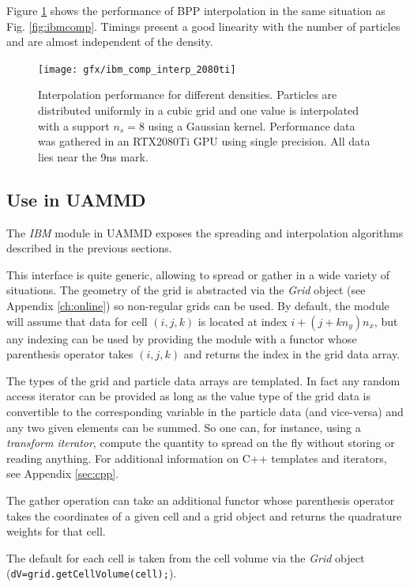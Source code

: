 \documentclass[ twoside,openright,titlepage,numbers=noenddot,%
headinclude,footinclude,cleardoublepage=empty,abstract=on,
BCOR=5mm,paper=b5,fontsize=11pt, dvipsnames
]{scrreprt}
\def\ucpp{uammd_cpp_lexer.py:UAMMDCppLexer -x}
\newcommand{\uammd}{\gls{UAMMD}\xspace}
\newcommand{\gpu}{\gls{GPU}\xspace}
\begin{document}
Figure \ref{fig:ibmcompinterp} shows the performance of BPP interpolation in the same situation as Fig. \ref{fig:ibmcomp}. Timings present a good linearity with the number of particles and are almost independent of the density. 
\begin{figure}[h]
  \centering
\texttt{[image: gfx/ibm\_comp\_interp\_2080ti]}
\caption{Interpolation performance for different densities. Particles are distributed uniformly in a cubic grid and one value is interpolated with a support $n_s=8$ using a Gaussian kernel. Performance data was gathered in an RTX2080Ti \gpu using single precision. All data lies near the 9ns mark.}
  \label{fig:ibmcompinterp}
\end{figure}


\subsection*{Use in UAMMD}

The \emph{IBM} module in \uammd exposes the spreading and interpolation algorithms described in the previous sections.

This interface is quite generic, allowing to spread or gather in a wide variety of situations. The geometry of the grid is abstracted via the \emph{Grid} object (see Appendix \ref{ch:online}) so non-regular grids can be used. By default, the module will assume that data for cell $(i,j,k)$ is located at index $i+(j+kn_y)n_x$, but any indexing can be used by providing the module with a functor whose parenthesis operator takes $(i,j,k)$ and returns the index in the grid data array.

The types of the grid and particle data arrays are templated. In fact any random access iterator can be provided as long as the value type of the grid data is convertible to the corresponding variable in the particle data (and vice-versa) and any two given elements can be summed. So one can, for instance, using a \emph{transform iterator},  compute the quantity to spread on the fly without storing or reading anything. For additional information on C++ templates and iterators, see Appendix \ref{sec:cpp}.

The gather operation can take an additional functor whose parenthesis operator takes the coordinates of a given cell and a grid object and returns the quadrature weights for that cell.

The default for each cell is taken from the cell volume via the \emph{Grid} object (\texttt{dV=grid.getCellVolume(cell);}).
\end{document}

